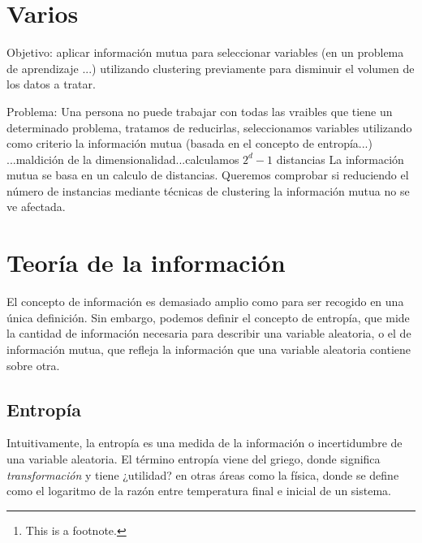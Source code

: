 \documentclass[10pt,a4paper]{article} %
\theoremstyle{definition}
\begin{document}
    \pagestyle{plain}
    \title{\rmfamily\normalfont{}}
    \author{}
    \date{} %

    \maketitle

    \begin{abstract}
        \noindent\lipsum[1] Just a test.\footnote{This is a footnote.}
    \end{abstract}

    \tableofcontents

    \section{Varios}
    Objetivo: aplicar información mutua para seleccionar variables (en un problema de aprendizaje ...) utilizando clustering previamente para disminuir el volumen de los datos a tratar.

    Problema: Una persona no puede trabajar con todas las vraibles que tiene un determinado problema, tratamos de reducirlas, seleccionamos variables utilizando como criterio la información mutua (basada en el concepto de entropía...)
    ...maldición de la dimensionalidad...calculamos $2^d-1$ distancias
    La información mutua se basa en un calculo de distancias. Queremos comprobar si reduciendo el número de instancias mediante técnicas de clustering la información mutua no se ve afectada.
     
    \section{Teoría de la información}

    El concepto de información es demasiado amplio como para ser recogido en una única definición. Sin embargo, podemos definir el concepto de entropía, que mide la cantidad de información necesaria para describir una variable aleatoria, o el de información mutua, que refleja la información que una variable aleatoria contiene sobre otra.

    \subsection{Entropía}

    Intuitivamente, la entropía es una medida de la información o incertidumbre de una variable aleatoria. El término entropía viene del griego, donde significa \textit{transformación} y tiene ¿utilidad? en otras áreas como la física, donde se define como el logaritmo de la razón entre temperatura final e inicial de un sistema.
\end{document}
